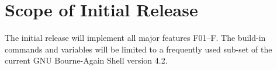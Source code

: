 \section{Scope of Initial Release}

The initial release will implement all major features F01--F\TheFeature.
The build-in commands and variables will be limited to a frequently used sub-set
of the current GNU Bourne-Again Shell version 4.2.

 
